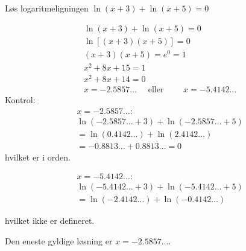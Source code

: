 \begin{example} Løs logaritmeligningen $\ln (x+3)+\ln (x+5)=0$

\begin{solution}
    \[
\begin{aligned}
& \ln (x+3)+\ln (x+5)=0 \\
& \ln [(x+3)(x+5)]=0 \\
& (x+3)(x+5)=e^0=1 \\
& x^2+8 x+15=1 \\
& x^2+8 x+14=0 \\
& x=-2.5857 \ldots \quad \text { eller } \qquad x=-5.4142 \ldots
\end{aligned}
\]
Kontrol:
\[
\begin{aligned}
& x=-2.5857 \ldots: \\
& \ln (-2.5857 \ldots+3)+\ln (-2.5857 \ldots+5) \\
& =\ln (0.4142 \ldots)+\ln (2.4142 \ldots) \\
& =-0.8813 \ldots+0.8813 \ldots=0
\end{aligned}
\]
hvilket er i orden.

\[
\begin{aligned}
& x=-5.4142 \ldots: \\
& \ln (-5.4142 \ldots+3)+\ln (-5.4142 \ldots+5) \\
& =\ln (-2.4142 \ldots)+\ln (-0.4142 \ldots)
\end{aligned}
\]

hvilket ikke er defineret.

Den eneste gyldige løsning er $x=-2.5857 \ldots$.
\end{solution}
    
\end{example}



